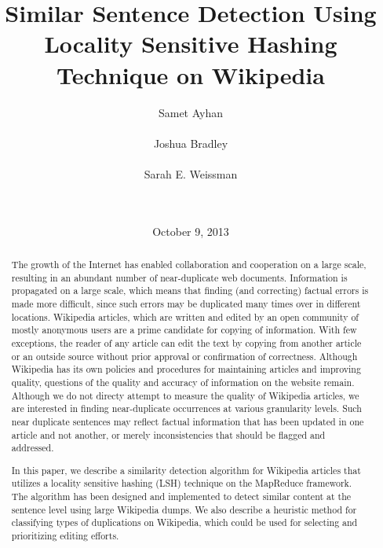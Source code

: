 \documentclass{acm_proc_article-sp}
\begin{document}
\title{Similar Sentence Detection Using Locality Sensitive Hashing Technique on Wikipedia}


\author{
\alignauthor Samet Ayhan\\
       \\
\alignauthor Joshua Bradley\\
       \\
\alignauthor Sarah E. Weissman\\
       \\
       \\
}

\date{October 9, 2013}

\maketitle
\begin{abstract}
The growth of the Internet has enabled collaboration and cooperation on a large scale, resulting in an abundant number of near-duplicate web documents. Information is propagated on a large scale, which means that finding (and correcting) factual errors is made more difficult, since such errors may be duplicated many times over in different locations. Wikipedia articles, which are written and edited by an open community of mostly anonymous users are a prime candidate for copying of information. With few exceptions, the reader of any article can edit the text by copying from another article or an outside source without prior approval or confirmation of correctness. Although Wikipedia has its own policies and procedures for maintaining articles and improving quality, questions of the quality and accuracy of information on the website remain. Although we do not directy attempt to measure the quality of Wikipedia articles, we are interested in finding near-duplicate occurrences at various granularity levels. Such near duplicate sentences may reflect factual information that has been updated in one article and not another, or merely inconsistencies that should be flagged and addressed.

In this paper, we describe a similarity detection algorithm for Wikipedia articles that utilizes a locality sensitive hashing (LSH) technique on the MapReduce framework. The algorithm has been designed and implemented to detect similar content at the sentence level using large Wikipedia dumps. We also describe a heuristic method for classifying types of duplications on Wikipedia, which could be used for selecting and prioritizing editing efforts.
\end{abstract}
\end{document}
